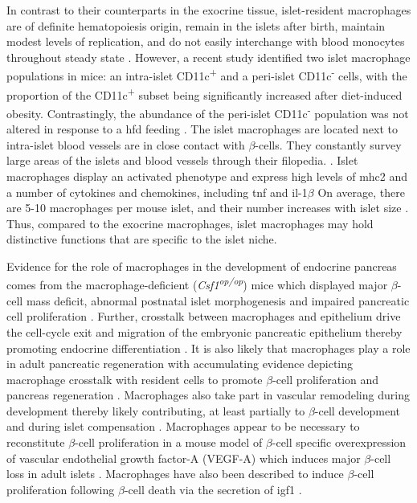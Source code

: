 \par In contrast to their counterparts in the exocrine tissue, islet-resident macrophages are of definite hematopoiesis origin, remain in the islets after birth, maintain modest levels of replication, and do not easily interchange with blood monocytes throughout steady state \textbf{\cite{calderon_pancreas_2015,cruz_macrophages_2020,carrero_resident_2017}}. However, a recent study identified two islet macrophage populations in mice: an intra-islet CD11c\textsuperscript{+} and a peri-islet CD11c\textsuperscript{-} cells, with the proportion of the CD11c\textsuperscript{+} subset being significantly increased after diet-induced obesity. Contrastingly, the abundance of the peri-islet CD11c\textsuperscript{-} population was not altered in response to a \gls{hfd} feeding \textbf{\cite{ying_expansion_2019}}. The islet macrophages are located next to intra-islet blood vessels are in close contact with $\beta$-cells. They constantly survey large areas of the islets and blood vessels through their filopedia. \textbf{\cite{carrero_resident_2017,calderon_dendritic_2008,zinselmeyer_resident_2018}}. Islet macrophages display an activated phenotype and express high levels of \gls{mhc2} and a number of cytokines and chemokines, including \gls{tnf} and \gls{il}-1$\beta$ \textbf{\cite{calderon_pancreas_2015,carrero_resident_2017,ferris_islet-resident_2017}} On average, there are 5-10 macrophages per mouse islet, and their number increases with islet size \textbf{\cite{unanue_macrophages_2016}}. Thus, compared to the exocrine macrophages, islet macrophages may hold distinctive functions that are specific to the islet niche.\\
\par Evidence for the role of macrophages in the development of endocrine pancreas comes from the macrophage-deficient (\textit{Csf1\textsuperscript{op/op}}) mice which displayed major $\beta$-cell mass deficit, abnormal postnatal islet morphogenesis and impaired pancreatic cell proliferation \textbf{\cite{l_insulin_2004}}. Further, crosstalk between macrophages and epithelium drive the cell-cycle exit and migration of the embryonic pancreatic epithelium thereby promoting endocrine differentiation \textbf{\cite{mussar_macrophageepithelium_2014}}. It is also likely that macrophages play a role in adult pancreatic regeneration with accumulating evidence depicting macrophage crosstalk with resident cells to promote $\beta$-cell proliferation and pancreas regeneration \textbf{\cite{cruz_macrophages_2020}}. Macrophages also take part in vascular remodeling during development thereby likely contributing, at least partially to $\beta$-cell development \textbf{\cite{van_gassen_concise_2015}} and during islet compensation \textbf{\cite{chittezhath_islet_2019}}. Macrophages appear to be necessary to reconstitute $\beta$-cell proliferation in a mouse model of $\beta$-cell specific overexpression of vascular endothelial growth factor-A (VEGF-A) which induces major $\beta$-cell loss in adult islets \textbf{\cite{brissova_islet_2014}}. Macrophages have also been described to induce $\beta$-cell proliferation following $\beta$-cell death via the secretion of \gls{igf1} \textbf{\cite{nackiewicz_islet_2020}}.\\ 

